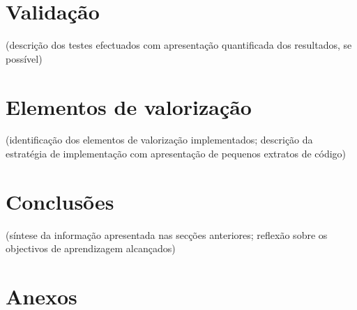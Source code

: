 \documentclass[11pt]{article}
\begin{document}
\section{Validação}

 (descrição dos testes efectuados com apresentação quantificada dos resultados, se possível)


\section{ Elementos de valorização}
  (identificação dos elementos de valorização implementados; descrição da estratégia de implementação com apresentação de pequenos extratos de código) 



\section{Conclusões}
 (síntese da informação apresentada nas secções anteriores; reflexão sobre os objectivos de aprendizagem alcançados)



\section{Anexos}



\end{document}
